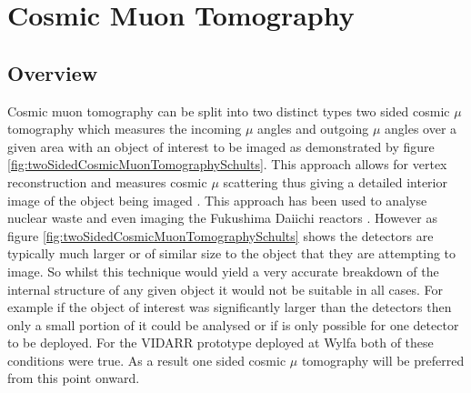
\chapter{Cosmic Muon Tomography}\label{chp:cosmicMuonTomography}

\ifpdf
    \graphicspath{{Chapter5/Figs/Raster/}{Chapter5/Figs/PDF/}{Chapter5/Figs/}}
\else
    \graphicspath{{Chapter5/Figs/Vector/}{Chapter5/Figs/}}
\fi

\section{Overview}\label{sec:cosMuOverview}
Cosmic muon tomography can be split into two distinct types two sided cosmic $\mu$ tomography which measures the incoming $\mu$ angles and outgoing $\mu$ angles over a given area with an object of interest to be imaged as demonstrated by figure \ref{fig:twoSidedCosmicMuonTomographySchults}. This approach allows for vertex reconstruction and measures cosmic $\mu$ scattering thus giving a detailed interior image of the object being imaged \cite{schultz_2007}. This approach has been used to analyse nuclear waste \cite{jonkmans2013nuclear} and even imaging the Fukushima Daiichi reactors \cite{miyadera2013imaging}. However as figure \ref{fig:twoSidedCosmicMuonTomographySchults} shows the  detectors are typically much larger or of similar size to the object that they are attempting to image. So whilst this technique would yield a very accurate breakdown of the internal structure of any given object it would not be suitable in all cases. For example if the object of interest was significantly larger than the detectors then only a small portion of it could be analysed or if is only possible for one detector to be deployed. For the VIDARR prototype deployed at Wylfa both of these conditions were true. As a result one sided cosmic $\mu$ tomography will be preferred from this point onward. 


